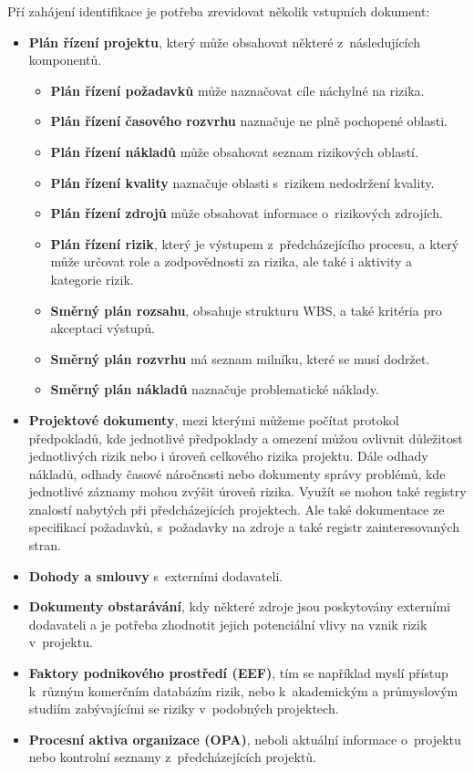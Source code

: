 Pří zahájení identifikace je potřeba zrevidovat několik vstupních dokument:
\begin{itemize}
    \item \textbf{Plán řízení projektu}, který může obsahovat některé z~následujících komponentů. 
    \begin{itemize}
        \item \textbf{Plán řízení požadavků} může naznačovat cíle náchylné na rizika.
        \item \textbf{Plán řízení časového rozvrhu} naznačuje ne plně pochopené oblasti.
        \item \textbf{Plán řízení nákladů} může obsahovat seznam rizikových oblastí.
        \item \textbf{Plán řízení kvality} naznačuje oblasti s~rizikem nedodržení kvality.
        \item \textbf{Plán řízení zdrojů} může obsahovat informace o~rizikových zdrojích.
        \item \textbf{Plán řízení rizik}, který je výstupem z~předcházejícího procesu, a který může určovat role a zodpovědnosti za rizika, ale také i aktivity a kategorie rizik.
        \item \textbf{Směrný plán rozsahu}, obsahuje strukturu WBS, a také kritéria pro akceptaci výstupů.
        \item \textbf{Směrný plán rozvrhu} má seznam milníku, které se musí dodržet. 
        \item \textbf{Směrný plán nákladů} naznačuje problematické náklady.
         
    \end{itemize}
     \item \textbf{Projektové dokumenty}, mezi kterými můžeme počítat protokol předpokladů, kde jednotlivé předpoklady a omezení můžou ovlivnit důležitost jednotlivých rizik nebo i úroveň celkového rizika projektu. Dále odhady nákladů, odhady časové náročnosti nebo dokumenty správy problémů, kde jednotlivé záznamy mohou zvýšit úroveň rizika. Využít se mohou také registry znalostí nabytých při předcházejících projektech. Ale také dokumentace ze specifikací požadavků, s~požadavky na zdroje a také registr zainteresovaných stran. 
    \item \textbf{Dohody a smlouvy} s~externími dodavateli.
    \item \textbf{Dokumenty obstarávání}, kdy některé zdroje jsou poskytovány externími dodavateli a je potřeba zhodnotit jejich potenciální vlivy na vznik rizik v~projektu.
    \item \textbf{Faktory podnikového prostředí (EEF)}, tím se například myslí přístup k~různým komerčním databázím rizik, nebo k~akademickým a průmyslovým studiím zabývajícími se riziky v~podobných projektech.
    \item \textbf{Procesní aktiva organizace (OPA)}, neboli aktuální informace o~projektu nebo kontrolní seznamy z~předcházejících projektů.
\end{itemize}

